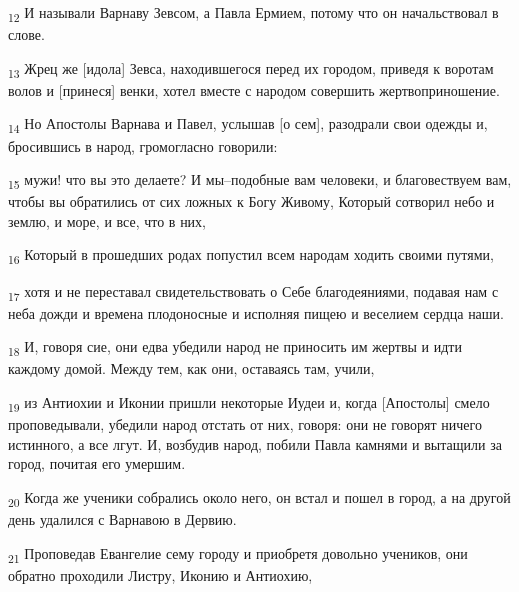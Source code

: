\begin{tcolorbox}
\textsubscript{12} И называли Варнаву Зевсом, а Павла Ермием, потому что он начальствовал в слове.
\end{tcolorbox}
\begin{tcolorbox}
\textsubscript{13} Жрец же [идола] Зевса, находившегося перед их городом, приведя к воротам волов и [принеся] венки, хотел вместе с народом совершить жертвоприношение.
\end{tcolorbox}
\begin{tcolorbox}
\textsubscript{14} Но Апостолы Варнава и Павел, услышав [о сем], разодрали свои одежды и, бросившись в народ, громогласно говорили:
\end{tcolorbox}
\begin{tcolorbox}
\textsubscript{15} мужи! что вы это делаете? И мы--подобные вам человеки, и благовествуем вам, чтобы вы обратились от сих ложных к Богу Живому, Который сотворил небо и землю, и море, и все, что в них,
\end{tcolorbox}
\begin{tcolorbox}
\textsubscript{16} Который в прошедших родах попустил всем народам ходить своими путями,
\end{tcolorbox}
\begin{tcolorbox}
\textsubscript{17} хотя и не переставал свидетельствовать о Себе благодеяниями, подавая нам с неба дожди и времена плодоносные и исполняя пищею и веселием сердца наши.
\end{tcolorbox}
\begin{tcolorbox}
\textsubscript{18} И, говоря сие, они едва убедили народ не приносить им жертвы и идти каждому домой. Между тем, как они, оставаясь там, учили,
\end{tcolorbox}
\begin{tcolorbox}
\textsubscript{19} из Антиохии и Иконии пришли некоторые Иудеи и, когда [Апостолы] смело проповедывали, убедили народ отстать от них, говоря: они не говорят ничего истинного, а все лгут. И, возбудив народ, побили Павла камнями и вытащили за город, почитая его умершим.
\end{tcolorbox}
\begin{tcolorbox}
\textsubscript{20} Когда же ученики собрались около него, он встал и пошел в город, а на другой день удалился с Варнавою в Дервию.
\end{tcolorbox}
\begin{tcolorbox}
\textsubscript{21} Проповедав Евангелие сему городу и приобретя довольно учеников, они обратно проходили Листру, Иконию и Антиохию,
\end{tcolorbox}
